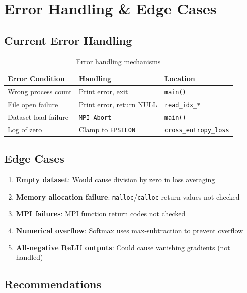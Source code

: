 \documentclass[11pt,a4paper]{article}
\begin{document}
\section{Error Handling \& Edge Cases}

\subsection{Current Error Handling}

\begin{table}[h]
\centering
\begin{tabular}{@{}lll@{}}
\toprule
\textbf{Error Condition} & \textbf{Handling} & \textbf{Location} \\
\midrule
Wrong process count & Print error, exit & \texttt{main()} \\
File open failure & Print error, return NULL & \texttt{read\_idx\_*} \\
Dataset load failure & \texttt{MPI\_Abort} & \texttt{main()} \\
Log of zero & Clamp to \texttt{EPSILON} & \texttt{cross\_entropy\_loss} \\
\bottomrule
\end{tabular}
\caption{Error handling mechanisms}
\end{table}

\subsection{Edge Cases}

\begin{enumerate}
    \item \textbf{Empty dataset}: Would cause division by zero in loss averaging
    \item \textbf{Memory allocation failure}: \texttt{malloc}/\texttt{calloc} return values not checked
    \item \textbf{MPI failures}: MPI function return codes not checked
    \item \textbf{Numerical overflow}: Softmax uses max-subtraction to prevent overflow
    \item \textbf{All-negative ReLU outputs}: Could cause vanishing gradients (not handled)
\end{enumerate}

\subsection{Recommendations}
\end{document}
